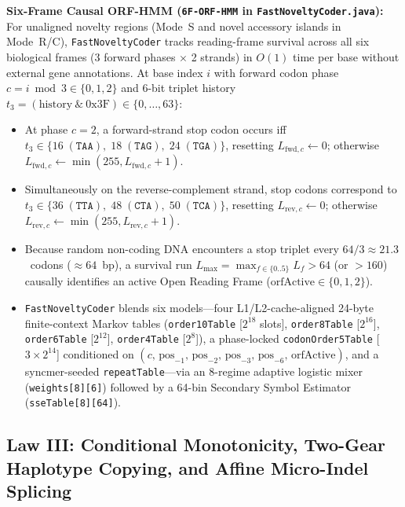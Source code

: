 \documentclass[10pt]{article}
\theoremstyle{definition}
\begin{document}
\noindent
\textbf{Six-Frame Causal ORF-HMM (\texttt{6F-ORF-HMM} in \texttt{FastNoveltyCoder.java}):}
For unaligned novelty regions (Mode~S and novel accessory islands in Mode~R/C), \texttt{FastNoveltyCoder} tracks reading-frame survival across all six biological frames (3 forward phases $\times$ 2 strands) in $O(1)$ time per base without external gene annotations. At base index $i$ with forward codon phase $c = i \bmod 3 \in \{0,1,2\}$ and 6-bit triplet history $t_3 = (\text{history} \ \& \ 0\text{x}3\text{F}) \in \{0,\dots,63\}$:
\begin{itemize}
  \item At phase $c=2$, a forward-strand stop codon occurs iff $t_3 \in \{16\;(\texttt{TAA}),\; 18\;(\texttt{TAG}),\; 24\;(\texttt{TGA})\}$, resetting $L_{\text{fwd},c} \leftarrow 0$; otherwise $L_{\text{fwd},c} \leftarrow \min(255, L_{\text{fwd},c}+1)$.
  \item Simultaneously on the reverse-complement strand, stop codons correspond to $t_3 \in \{36\;(\texttt{TTA}),\; 48\;(\texttt{CTA}),\; 50\;(\texttt{TCA})\}$, resetting $L_{\text{rev},c} \leftarrow 0$; otherwise $L_{\text{rev},c} \leftarrow \min(255, L_{\text{rev},c}+1)$.
  \item Because random non-coding DNA encounters a stop triplet every $64/3 \approx 21.3$~codons ($\approx 64$~bp), a survival run $L_{\max} = \max_{f \in \{0..5\}} L_f > 64$ (or $> 160$) causally identifies an active Open Reading Frame ($\text{orfActive} \in \{0,1,2\}$).
  \item \texttt{FastNoveltyCoder} blends six models---four L1/L2-cache-aligned 24-byte finite-context Markov tables (\texttt{order10Table} [$2^{18}$ slots], \texttt{order8Table} [$2^{16}$], \texttt{order6Table} [$2^{12}$], \texttt{order4Table} [$2^8$]), a phase-locked \texttt{codonOrder5Table} [$3 \times 2^{14}$] conditioned on $(c,\, \text{pos}_{-1},\, \text{pos}_{-2},\, \text{pos}_{-3},\, \text{pos}_{-6},\, \text{orfActive})$, and a syncmer-seeded \texttt{repeatTable}---via an 8-regime adaptive logistic mixer (\texttt{weights[8][6]}) followed by a 64-bin Secondary Symbol Estimator (\texttt{sseTable[8][64]}).
\end{itemize}

\subsection{Law III: Conditional Monotonicity, Two-Gear Haplotype Copying, and Affine Micro-Indel Splicing}
\end{document}
